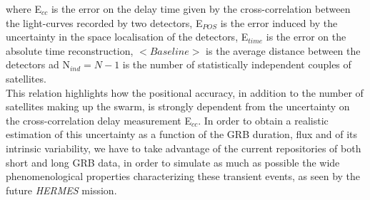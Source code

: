\documentclass[]{spie}  %
\def \her{\textit{HERMES}\xspace}
\begin{document}
where E$_{cc}$ is the error on the delay time given by the cross-correlation between the light-curves recorded by two detectors, E$_{POS}$ is the error induced by the uncertainty in the space localisation of the detectors,  E$_{time}$ is the error on the absolute time reconstruction, $<Baseline>$ is the average distance between the detectors ad N$_{ind} = N-1$ is the number of statistically independent couples of satellites. \\
This relation highlights how the positional accuracy, in addition to the number of satellites making up the swarm, is strongly dependent from the uncertainty on the cross-correlation delay measurement E$_{cc}$. In order to obtain a realistic estimation of this uncertainty as a function of the GRB duration, flux and of its intrinsic variability, we have to take advantage of the current repositories of both short and long GRB data, in order to simulate as much as possible the wide phenomenological properties characterizing these transient events, as seen by the future \her mission. 
\end{document}
